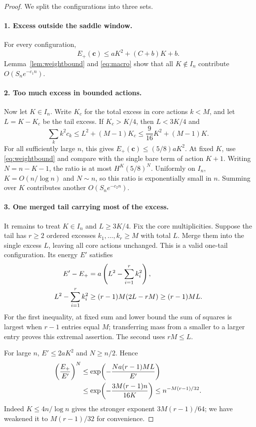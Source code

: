 \documentclass[11pt,a4paper]{article}
\numberwithin{equation}{section}
\theoremstyle{definition}
\theoremstyle{remark}
\begin{document}
\begin{proof}
We split the configurations into three sets.

\paragraph{1. Excess outside the saddle window.}
For every configuration,
\[
 E_+(\mathbf c)\le aK^2+(C+b)K+b.
\]
Lemma~\ref{lem:weightbound} and \eqref{eq:macro} show that all
$K\notin I_n$ contribute $O(S_ne^{-c_1n})$.

\paragraph{2. Too much excess in bounded actions.}
Now let $K\in I_n$. Write $K_c$ for the total excess in core actions
$k<M$, and let $L=K-K_c$ be the tail excess. If $K_c>K/4$, then
$L<3K/4$ and
\[
 \sum_k k^2c_k\le L^2+(M-1)K_c
                 \le\frac9{16}K^2+(M-1)K.
\]
For all sufficiently large $n$, this gives $E_+(\mathbf c)\le
(5/8)aK^2$. At fixed $K$, use \eqref{eq:weightbound} and compare with
the single bare term of action $K+1$. Writing $N=n-K-1$, the ratio is
at most $H^K(5/8)^N$. Uniformly on $I_n$, $K=O(n/\log n)$ and
$N\sim n$, so this ratio is exponentially small in $n$.
Summing over $K$ contributes another $O(S_ne^{-c_2n})$.

\paragraph{3. One merged tail carrying most of the excess.}
It remains to treat $K\in I_n$ and $L\ge3K/4$. Fix the core
multiplicities. Suppose the tail has $r\ge2$ ordered excesses
$k_1,\ldots,k_r\ge M$ with total $L$. Merge them into the single
excess $L$, leaving all core actions unchanged. This is a valid one-tail
configuration. Its energy $E'$ satisfies
\begin{align}
 E'-E_+&=a\left(L^2-\sum_{i=1}^r k_i^2\right),\notag\\
 L^2-\sum_{i=1}^r k_i^2
 &\ge (r-1)M(2L-rM)\ge(r-1)ML.
 \label{eq:energy-drop}
\end{align}
For the first inequality, at fixed sum and lower bound the sum of squares
is largest when $r-1$ entries equal $M$; transferring mass from a smaller
to a larger entry proves this extremal assertion. The second uses $rM\le L$.

For large $n$, $E'\le2aK^2$ and $N\ge n/2$. Hence
\begin{align}
 \left(\frac{E_+}{E'}\right)^N
 &\le\exp\!\left(-\frac{Na(r-1)ML}{E'}\right)\notag\\
 &\le\exp\!\left(-\frac{3M(r-1)n}{16K}\right)
 \le n^{-M(r-1)/32}.
 \label{eq:energy-penalty}
\end{align}
Indeed $K\le4n/\log n$ gives the stronger exponent $3M(r-1)/64$;
we have weakened it to $M(r-1)/32$ for convenience.


\end{proof}
\end{document}
